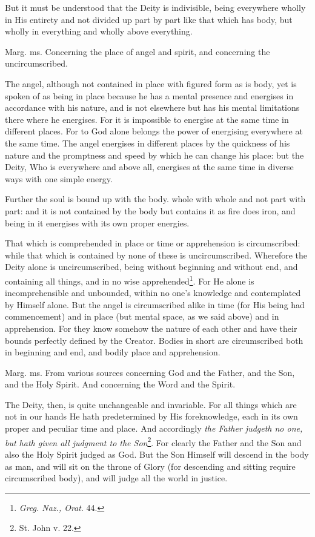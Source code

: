 But it must be understood that the Deity is indivisible, being everywhere wholly in His entirety and not divided up part by part like that which has body, but wholly in everything and wholly above everything.

Marg. ms. Concerning the place of angel and spirit, and concerning the uncircumscribed.

The angel, although not contained in place with figured form as is body, yet is spoken of as being in place because he has a mental presence and energises in accordance with his nature, and is not elsewhere but has his mental limitations there where he energises. For it is impossible to energise at the same time in different places. For to God alone belongs the power of energising everywhere at the same time. The angel energises in different places by the quickness of his nature and the promptness and speed by which he can change his place: but the Deity, Who is everywhere and above all, energises at the same time in diverse ways with one simple energy.

Further the soul is bound up with the body. whole with whole and not part with part: and it is not contained by the body but contains it as fire does iron, and being in it energises with its own proper energies.

That which is comprehended in place or time or apprehension is circumscribed: while that which is contained by none of these is uncircumscribed. Wherefore the Deity alone is uncircumscribed, being without beginning and without end, and containing all things, and in no wise apprehended\footnote{\emph{Greg. Naz., Orat}. 44.}. For He alone is incomprehensible and unbounded, within no one’s knowledge and contemplated by Himself alone. But the angel is circumscribed alike in time (for His being had commencement) and in place (but mental space, as we said above) and in apprehension. For they know somehow the nature of each other and have their bounds perfectly defined by the Creator. Bodies in short are circumscribed both in beginning and end, and bodily place and apprehension.

Marg. ms. From various sources concerning God and the Father, and the Son, and the Holy Spirit. And concerning the Word and the Spirit.

The Deity, then, is quite unchangeable and invariable. For all things which are not in our hands He hath predetermined by His foreknowledge, each in its own proper and peculiar time and place. And accordingly \emph{the Father judgeth no one, but hath given all judgment to the Son}\footnote{St. John v. 22.}. For clearly the Father and the Son and also the Holy Spirit judged as God. But the Son Himself will descend in the body as man, and will sit on the throne of Glory (for descending and sitting require circumscribed body), and will judge all the world in justice.

